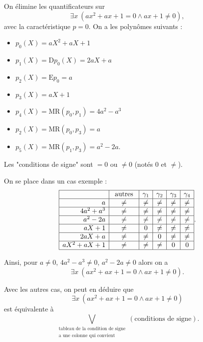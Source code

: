 \documentclass[./main]{subfiles}
\begin{document}
  \begin{exm}
    On élimine les quantificateurs sur \[
    \exists x \: (a x^2 + ax + 1 = 0 \land ax + 1 \neq 0)
    ,\]
    avec la caractéristique $p = 0$.
    On a les polynômes suivants :
    \begin{itemize}
      \item $p_0(X) = aX^2 + aX + 1$
      \item $p_1(X) = \mathrm{D}p_0(X) = 2aX + a$
      \item $p_2(X) = \mathrm{E}p_0 = a$ 
      \item $p_3(X) = aX +  1$
      \item $p_4(X) = \mathrm{MR}(p_0, p_1) = 4a^2 - a^3$
      \item $p_2(X) = \mathrm{MR}(p_0, p_3) = a$
      \item $p_5(X) = \mathrm{MR}(p_1, p_3) = a^2 - 2a$.
    \end{itemize}

    Les "conditions de signe" sont $= 0$ ou $\neq 0$ (notés $0$ et $\neq$).

    On se place dans un cas exemple :
    \[
    \begin{array}{|r|c|c|c|c|c|}
      \hline
      & \text{ autres } & \gamma_1 & \gamma_2 & \gamma_3 & \gamma_4\\ \hline
      a & \neq & \neq & \neq & \neq & \neq \\ \hline
      4a^2 + a^3 & \neq & \neq & \neq & \neq & \neq \\ \hline
      a^2 - 2a & \neq & \neq & \neq & \neq & \neq \\ \hline
      aX + 1 & \neq & 0 & \neq & \neq & \neq \\ \hline
      2aX + a & \neq & \neq & 0 & \neq & \neq \\ \hline
      aX^2 + aX + 1 & \neq & \neq & \neq & 0 & 0 \\ \hline
    \end{array}
    .\]

    Ainsi, pour $a\neq 0$, $4a^2-a^3 \neq 0$, $a^2 - 2a \neq 0$ alors on a \[
      \exists x \: (ax^2 + ax + 1 = 0 \land ax + 1 \neq 0)
    .\]

    Avec les autres cas, on peut en déduire que \[
    \exists x \: (ax^2 + a x + 1 = 0 \land ax + 1 \neq 0)
    \]
    est équivalente à \[
      \bigvee_{\substack{\text{tableau de la condition de signe}\\ \text{a une colonne qui convient}}}
      (\text{conditions de signe})
    .\] 
  \end{exm}
\end{document}
